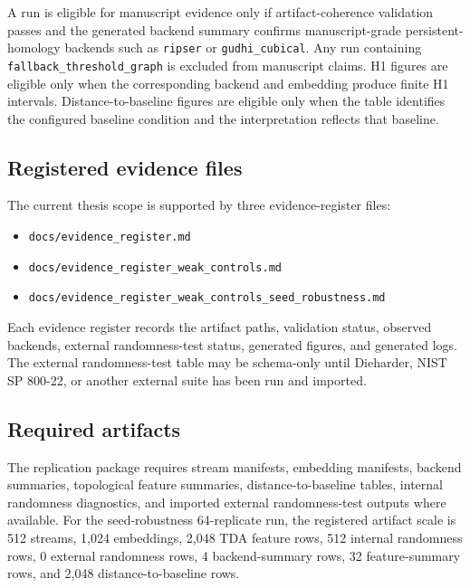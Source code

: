 A run is eligible for manuscript evidence only if artifact-coherence validation passes and the generated backend summary confirms manuscript-grade persistent-homology backends such as \texttt{ripser} or \texttt{gudhi\_cubical}. Any run containing \texttt{fallback\_threshold\_graph} is excluded from manuscript claims. H1 figures are eligible only when the corresponding backend and embedding produce finite H1 intervals. Distance-to-baseline figures are eligible only when the table identifies the configured baseline condition and the interpretation reflects that baseline.

\subsection{Registered evidence files}
\label{app:registered-evidence-files}

The current thesis scope is supported by three evidence-register files:

\begin{itemize}
  \item \texttt{docs/evidence\_register.md}
  \item \texttt{docs/evidence\_register\_weak\_controls.md}
  \item \texttt{docs/evidence\_register\_weak\_controls\_seed\_robustness.md}
\end{itemize}

Each evidence register records the artifact paths, validation status, observed backends, external randomness-test status, generated figures, and generated logs. The external randomness-test table may be schema-only until Dieharder, NIST SP 800-22, or another external suite has been run and imported.

\subsection{Required artifacts}
\label{app:required-artifacts}

The replication package requires stream manifests, embedding manifests, backend summaries, topological feature summaries, distance-to-baseline tables, internal randomness diagnostics, and imported external randomness-test outputs where available. For the seed-robustness 64-replicate run, the registered artifact scale is 512 streams, 1,024 embeddings, 2,048 TDA feature rows, 512 internal randomness rows, 0 external randomness rows, 4 backend-summary rows, 32 feature-summary rows, and 2,048 distance-to-baseline rows.


